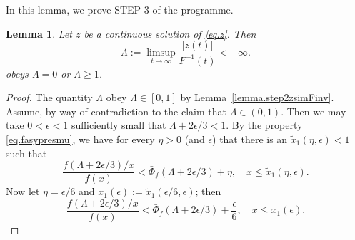 \documentclass[a4paper,10pt,reqno]{amsart}
\numberwithin{equation}{section}
\newtheorem{lemma}{Lemma}
\theoremstyle{definition}
\theoremstyle{remark}
\DeclareMathOperator{\1}{\mathbbm 1}
\begin{document}
	In this lemma, we prove STEP 3 of the programme.  
	\begin{lemma} \label{lemma.step3zsimFinv}
		Let $z$ be a continuous solution of \eqref{eq.z}. Then
		\[
		\Lambda:=\limsup_{t\to\infty} \frac{|z(t)|}{F^{-1}(t)}<+\infty.
		\] 
		obeys $\Lambda=0$ or $\Lambda\geq 1$.  	
	\end{lemma}
	\begin{proof}
		The quantity $\Lambda$ obey $\Lambda\in [0,1]$ by Lemma~\ref{lemma.step2zsimFinv}. Assume, by way of contradiction to the claim that $\Lambda\in (0,1)$. Then we may take $0<\epsilon<1$ sufficiently small that $\Lambda+2\epsilon/3<1$. By the property \eqref{eq.fasypresmu}, we have for every $\eta>0$ (and $\epsilon$) that there is an $\tilde{x}_1(\eta,\epsilon)<1$ such that 
		\[
		\frac{f(\Lambda+2\epsilon/3)/x}{f(x)}<\bar{\Phi}_f(\Lambda+2\epsilon/3)+\eta, \quad x\leq \tilde{x}_1(\eta,\epsilon).
		\]  
		Now let $\eta=\epsilon/6$ and $x_1(\epsilon):=\tilde{x}_1(\epsilon/6,\epsilon)$; then 
		\[
		\frac{f(\Lambda+2\epsilon/3)/x}{f(x)}<\bar{\Phi}_f(\Lambda+2\epsilon/3)+\frac{\epsilon}{6}, \quad x\leq x_1(\epsilon).
		\] 
		

\end{proof}
\end{document}
